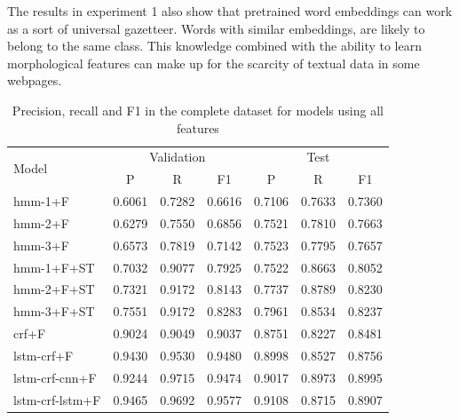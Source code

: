\documentclass[sigconf]{acmart}
\begin{document}
The results in experiment 1 also show that pretrained word embeddings can work as a sort of
universal gazetteer. Words with similar embeddings, are likely to belong to the same class.
This knowledge combined with the ability to learn morphological features can make up for 
the scarcity of textual data in some webpages.

\begin{table}[h]
  \small
  \begin{center}
    \begin{tabular}{ lllllll }
      \toprule
      \multirow{2}{*}{Model} & \multicolumn{3}{c}{Validation} & \multicolumn{3}{c}{Test} \\
                             & \multicolumn{1}{c}{P} & \multicolumn{1}{c}{R} & \multicolumn{1}{c}{F1}
                             & \multicolumn{1}{c}{P} & \multicolumn{1}{c}{R} & \multicolumn{1}{c}{F1} \\
      \midrule
      hmm-1+F	      & 0.6061 & 0.7282 & 0.6616 & 0.7106 & 0.7633 & 0.7360 \\
      hmm-2+F	      & 0.6279 & 0.7550 & 0.6856 & 0.7521 & 0.7810 & 0.7663 \\
      hmm-3+F	      & 0.6573 & 0.7819 & 0.7142 & 0.7523 & 0.7795 & 0.7657 \\
      hmm-1+F+ST      & 0.7032 & 0.9077 & 0.7925 & 0.7522 & 0.8663 & 0.8052 \\
      hmm-2+F+ST      & 0.7321 & 0.9172 & 0.8143 & 0.7737 & 0.8789 & 0.8230 \\
      hmm-3+F+ST      & 0.7551 & 0.9172 & 0.8283 & 0.7961 & 0.8534 & 0.8237 \\
      crf+F	      & 0.9024 & 0.9049 & 0.9037 & 0.8751 & 0.8227 & 0.8481 \\
      lstm-crf+F      & 0.9430 & 0.9530 & 0.9480 & 0.8998 & 0.8527 & 0.8756 \\
      lstm-crf-cnn+F  & 0.9244 & 0.9715 & 0.9474 & 0.9017 & 0.8973 & 0.8995 \\
      lstm-crf-lstm+F & 0.9465 & 0.9692 & 0.9577 & 0.9108 & 0.8715 & 0.8907 \\
      \bottomrule
    \end{tabular}
  \end{center}
  \caption{Precision, recall and F1 in the complete dataset for models using all features}
  \label{tab:experiment1f}
\end{table}
\end{document}
